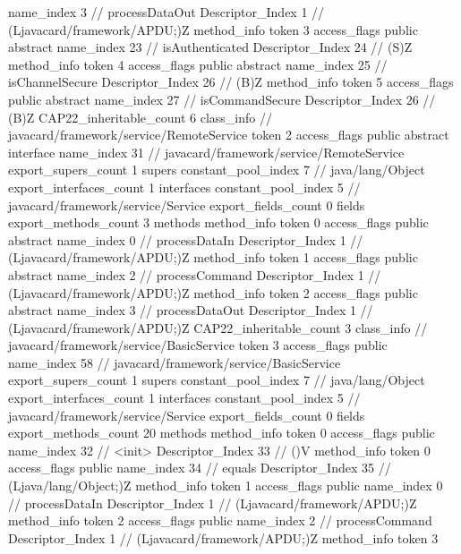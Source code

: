 {{{{{					name_index	3		// processDataOut
					Descriptor_Index	1		// (Ljavacard/framework/APDU;)Z
				}
				method_info {
					token	3
					access_flags	public abstract
					name_index	23		// isAuthenticated
					Descriptor_Index	24		// (S)Z
				}
				method_info {
					token	4
					access_flags	public abstract
					name_index	25		// isChannelSecure
					Descriptor_Index	26		// (B)Z
				}
				method_info {
					token	5
					access_flags	public abstract
					name_index	27		// isCommandSecure
					Descriptor_Index	26		// (B)Z
				}
			}
			CAP22_inheritable_count	6
		}
		class_info {		// javacard/framework/service/RemoteService
			token	2
			access_flags	public abstract interface
			name_index	31		// javacard/framework/service/RemoteService
			export_supers_count	1
			supers {
				constant_pool_index	7		// java/lang/Object
			}
			export_interfaces_count	1
			interfaces {
				constant_pool_index	5		// javacard/framework/service/Service
			}
			export_fields_count	0
			fields {
			}
			export_methods_count	3
			methods {
				method_info {
					token	0
					access_flags	public abstract
					name_index	0		// processDataIn
					Descriptor_Index	1		// (Ljavacard/framework/APDU;)Z
				}
				method_info {
					token	1
					access_flags	public abstract
					name_index	2		// processCommand
					Descriptor_Index	1		// (Ljavacard/framework/APDU;)Z
				}
				method_info {
					token	2
					access_flags	public abstract
					name_index	3		// processDataOut
					Descriptor_Index	1		// (Ljavacard/framework/APDU;)Z
				}
			}
			CAP22_inheritable_count	3
		}
		class_info {		// javacard/framework/service/BasicService
			token	3
			access_flags	public
			name_index	58		// javacard/framework/service/BasicService
			export_supers_count	1
			supers {
				constant_pool_index	7		// java/lang/Object
			}
			export_interfaces_count	1
			interfaces {
				constant_pool_index	5		// javacard/framework/service/Service
			}
			export_fields_count	0
			fields {
			}
			export_methods_count	20
			methods {
				method_info {
					token	0
					access_flags	public
					name_index	32		// <init>
					Descriptor_Index	33		// ()V
				}
				method_info {
					token	0
					access_flags	public
					name_index	34		// equals
					Descriptor_Index	35		// (Ljava/lang/Object;)Z
				}
				method_info {
					token	1
					access_flags	public
					name_index	0		// processDataIn
					Descriptor_Index	1		// (Ljavacard/framework/APDU;)Z
				}
				method_info {
					token	2
					access_flags	public
					name_index	2		// processCommand
					Descriptor_Index	1		// (Ljavacard/framework/APDU;)Z
				}
				method_info {
					token	3
}}}}}
